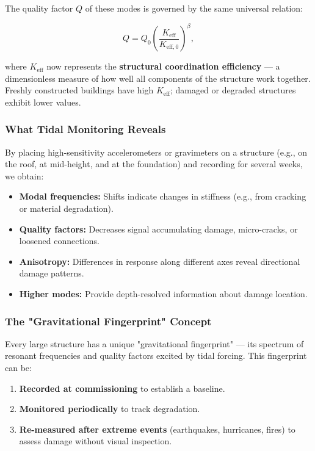 \documentclass[12pt,a4paper]{article}
\theoremstyle{remark}
\begin{document}
	The quality factor \(Q\) of these modes is governed by the same universal relation:
	
	\begin{equation}
		Q = Q_0 \left( \frac{K_{\mathrm{eff}}}{K_{\mathrm{eff},0}} \right)^{\beta},
		\label{eq:structural-Q}
	\end{equation}
	
	where \(K_{\mathrm{eff}}\) now represents the \textbf{structural coordination efficiency} — a dimensionless measure of how well all components of the structure work together. Freshly constructed buildings have high \(K_{\mathrm{eff}}\); damaged or degraded structures exhibit lower values.
	
	\subsubsection{What Tidal Monitoring Reveals}
	
	By placing high-sensitivity accelerometers or gravimeters on a structure (e.g., on the roof, at mid-height, and at the foundation) and recording for several weeks, we obtain:
	
	\begin{itemize}
		\item \textbf{Modal frequencies:} Shifts indicate changes in stiffness (e.g., from cracking or material degradation).
		\item \textbf{Quality factors:} Decreases signal accumulating damage, micro-cracks, or loosened connections.
		\item \textbf{Anisotropy:} Differences in response along different axes reveal directional damage patterns.
		\item \textbf{Higher modes:} Provide depth-resolved information about damage location.
	\end{itemize}
	
	\subsubsection{The "Gravitational Fingerprint" Concept}
	
	Every large structure has a unique "gravitational fingerprint" — its spectrum of resonant frequencies and quality factors excited by tidal forcing. This fingerprint can be:
	\begin{enumerate}
		\item \textbf{Recorded at commissioning} to establish a baseline.
		\item \textbf{Monitored periodically} to track degradation.
		\item \textbf{Re-measured after extreme events} (earthquakes, hurricanes, fires) to assess damage without visual inspection.
	\end{enumerate}
	
\end{document}
